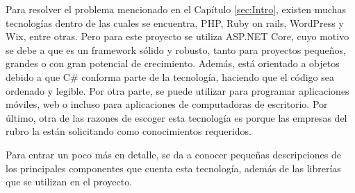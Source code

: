 Para resolver el problema mencionado en el Capítulo \ref{sec:Intro}, existen muchas tecnologías dentro de las cuales se encuentra, PHP, Ruby on rails, WordPress y Wix, entre otras. Pero para este proyecto se utiliza ASP.NET Core, cuyo motivo se debe a que es un framework sólido y robusto, tanto para proyectos pequeños, grandes o con gran potencial de crecimiento. Además, está orientado a objetos debido a que C\# conforma parte de la tecnología, haciendo que el código sea ordenado y legible. Por otra parte, se puede utilizar para programar aplicaciones móviles, web o incluso para aplicaciones de computadoras de escritorio. Por último, otra de las razones de escoger esta tecnología es porque las empresas del rubro la están solicitando como conocimientos requeridos. 

Para entrar un poco más en detalle, se da a conocer pequeñas descripciones de los principales componentes que cuenta esta tecnología, además de las librerías que se utilizan en el proyecto.


